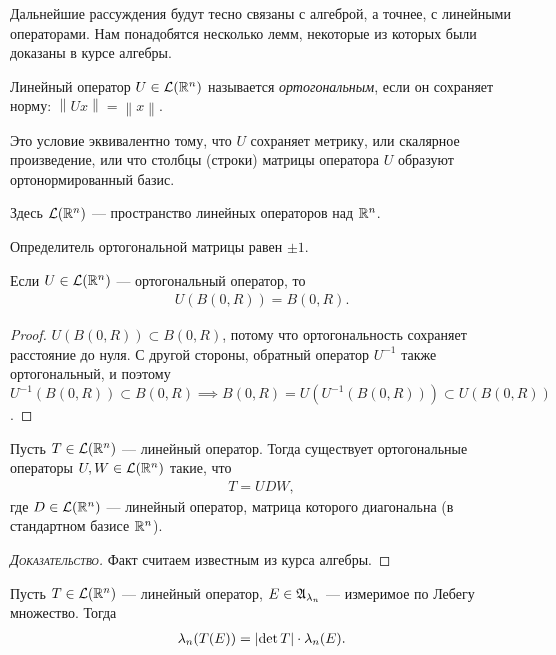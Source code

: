 Дальнейшие рассуждения будут тесно связаны с алгеброй, а точнее, с линейными операторами. Нам понадобятся несколько лемм, некоторые из которых были доказаны в курсе алгебры. 
\begin{df}
 \label{definition:orthogonal_operator}
 Линейный оператор $U \in \mathcal{L}(\mathbb{R}^{n})$ называется \textit{ортогональным}, если он сохраняет норму: $\left\| Ux \right\| = \left\| x \right\|$.

 Это условие эквивалентно тому, что $U$ сохраняет метрику, или скалярное произведение, или что столбцы (строки) матрицы оператора $U$ образуют ортонормированный базис.

 Здесь $\mathcal{L}(\mathbb{R}^{n})$ --- пространство линейных операторов над $\mathbb{R}^{n}$.
\end{df}
\begin{remrk}
 Определитель ортогональной матрицы равен $\pm 1$.
\end{remrk}
\begin{lm}
 Если $U \in \mathcal{L}(\mathbb{R}^{n})$ --- ортогональный оператор, то \begin{align*}
  U(B(0, R)) = B(0, R)
 .\end{align*} 
\end{lm}
\begin{proof}
 $U(B(0, R)) \subset B(0, R)$, потому что ортогональность сохраняет расстояние до нуля. С другой стороны, обратный оператор $U^{-1}$ также ортогональный, и поэтому $U^{-1}(B(0, R)) \subset B(0, R) \implies B(0, R) = U(U^{-1}(B(0, R))) \subset U(B(0, R))$.
\end{proof}
\begin{lm}
 \label{lemma:UDW_decomposition}
 Пусть $T \in \mathcal{L}(\mathbb{R}^{n})$ --- линейный оператор. Тогда существует ортогональные операторы $U, W \in \mathcal{L}(\mathbb{R}^n)$ такие, что \begin{align*}
  T = UDW,
 \end{align*} где $D \in \mathcal{L}(\mathbb{R}^{n})$ --- линейный оператор, матрица которого диагональна (в стандартном базисе $\mathbb{R}^{n}$).
\end{lm}
\begin{proof}[\normalfont\textsc{Доказательство}]
 Факт считаем известным из курса алгебры.
\end{proof}
\begin{thm}
 \label{theorem:measure_of_linear_image}
 Пусть $T \in \mathcal{L}(\mathbb{R}^{n})$ --- линейный оператор, $E \in \mathfrak{A}_{\lambda_n}$ --- измеримое по Лебегу множество. Тогда \begin{align*}
  \lambda_n(T(E)) = \left| \det T \right| \cdot \lambda_n(E)
 .\end{align*} 
\end{thm}
